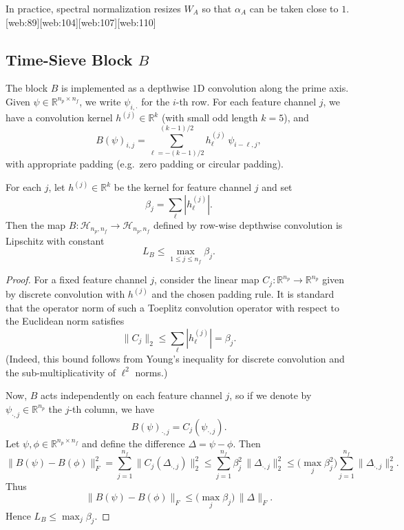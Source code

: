 \documentclass[11pt]{article}
\theoremstyle{definition}
\theoremstyle{plain}
\begin{document}
In practice, spectral normalization resizes $W_A$ so that $\alpha_A$ can be taken close to $1$.[web:89][web:104][web:107][web:110]

\subsection{Time-Sieve Block $B$}

The block $B$ is implemented as a depthwise $1$D convolution along the prime axis.
Given $\psi \in \mathbb{R}^{n_p \times n_f}$, we write $\psi_{i,\cdot}$ for the $i$-th row.
For each feature channel $j$, we have a convolution kernel $h^{(j)} \in \mathbb{R}^{k}$ (with small odd length $k=5$), and
\[
  B(\psi)_{i,j} = \sum_{\ell=-(k-1)/2}^{(k-1)/2} h^{(j)}_\ell\,\psi_{i-\ell,j},
\]
with appropriate padding (e.g.\ zero padding or circular padding).

\begin{lemma}\label{lem:L_B}
For each $j$, let $h^{(j)} \in \mathbb{R}^{k}$ be the kernel for feature channel $j$ and set
\[
  \beta_j = \sum_{\ell} |h^{(j)}_\ell|.
\]
Then the map $B: \mathcal{H}_{n_p,n_f} \to \mathcal{H}_{n_p,n_f}$ defined by row-wise depthwise convolution is Lipschitz with constant
\[
  L_B \le \max_{1 \le j \le n_f} \beta_j.
\]
\end{lemma}

\begin{proof}
For a fixed feature channel $j$, consider the linear map $C_j : \mathbb{R}^{n_p} \to \mathbb{R}^{n_p}$ given by discrete convolution with $h^{(j)}$ and the chosen padding rule.
It is standard that the operator norm of such a Toeplitz convolution operator with respect to the Euclidean norm satisfies
\[
  \|C_j\|_2 \le \sum_{\ell} |h^{(j)}_\ell| = \beta_j.
\]
(Indeed, this bound follows from Young's inequality for discrete convolution and the sub-multiplicativity of $\ell^2$ norms.)

Now, $B$ acts independently on each feature channel $j$, so if we denote by $\psi_{\cdot,j} \in \mathbb{R}^{n_p}$ the $j$-th column, we have
\[
  B(\psi)_{\cdot,j} = C_j(\psi_{\cdot,j}).
\]
Let $\psi,\phi \in \mathbb{R}^{n_p \times n_f}$ and define the difference $\Delta = \psi - \phi$.
Then
\[
  \|B(\psi) - B(\phi)\|_F^2
  = \sum_{j=1}^{n_f} \|C_j(\Delta_{\cdot,j})\|_2^2
  \le \sum_{j=1}^{n_f} \beta_j^2 \,\|\Delta_{\cdot,j}\|_2^2
  \le \biggl(\max_j \beta_j^2\biggr) \sum_{j=1}^{n_f} \|\Delta_{\cdot,j}\|_2^2.
\]
Thus
\[
  \|B(\psi) - B(\phi)\|_F \le \bigl(\max_j \beta_j\bigr)\,\|\Delta\|_F.
\]
Hence $L_B \le \max_j \beta_j$.
\end{proof}
\end{document}
